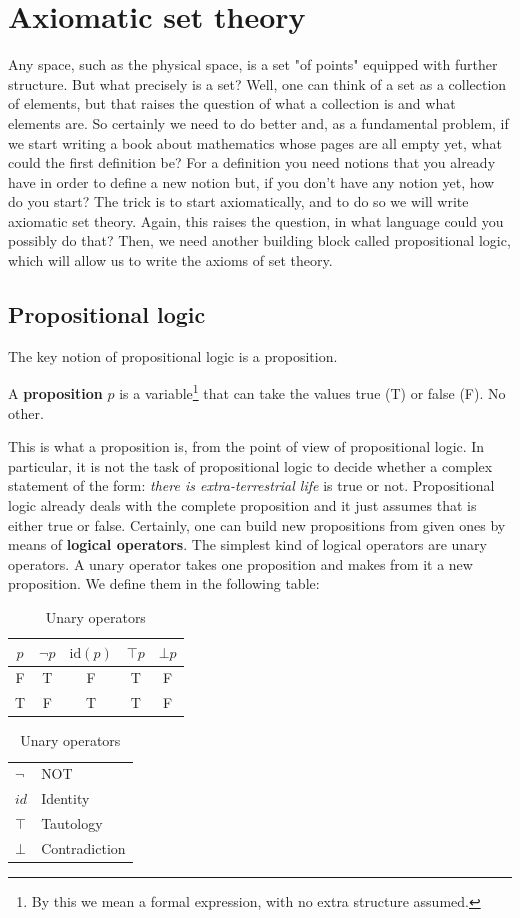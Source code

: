 \documentclass[root.tex]{subfiles}
\begin{document}
\chapter{Axiomatic set theory}%

Any space, such as the physical space, is a set "of points" equipped with further structure. But what precisely is a set? Well, one can think of a set as a collection of elements, but that raises the question of what a collection is and what elements are. So certainly we need to do better and, as a fundamental problem, if we start writing a book about mathematics whose pages are all empty yet, what could the first definition be? For a definition you need notions that you already have in order to define a new notion but, if you don't have any notion yet, how do you start? The trick is to start axiomatically, and to do so we will write axiomatic set theory. Again, this raises the question, in what language could you possibly do that? Then, we need another building block called propositional logic, which will allow us to write the axioms of set theory. 

\section{Propositional logic}%
The key notion of propositional logic is a proposition. 
\begin{mydef}
  A \textbf{proposition} $p$ is a variable\footnote{By this we mean a formal expression, with no extra structure assumed.} that can take the values true (T) or false (F). No other. 
\end{mydef}
This is what a proposition is, from the point of view of propositional logic. In particular, it is not the task of propositional logic to decide whether a complex statement of the form: \emph{there is extra-terrestrial life} is true or not. Propositional logic already deals with the complete proposition and it just assumes that is either true or false. Certainly, one can build new propositions from given ones by means of \textbf{logical operators}. The simplest kind of logical operators are unary operators. A unary operator takes one proposition and makes from it a new proposition. We define them in the following table:
    \begin{table}[h]
      \centering
      \begin{tabular}{c||c|c|c|c}
        $p$ & $\neg p$ & $\mathrm{id}(p)$ & $\top p$ & $\bot p$ \\
        \hline
        \rule{0pt}{12pt} F & T & F & T & F\\
                         T & F & T & T & F
      \end{tabular}\qquad
      \begin{tabular}{ll}
        $\neg$ & NOT\\
        $id$   & Identity\\
        $\top$ & Tautology\\
        $\bot$ & Contradiction
      \end{tabular}
      \caption{Unary operators}
    \end{table}
\end{document}
